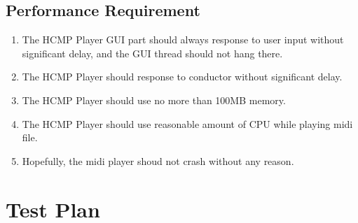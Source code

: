 \subsection{Performance Requirement}
\begin{enumerate}
  \item The HCMP Player GUI part should always response to user input without 
        significant delay, and the GUI thread should not hang there.
  \item The HCMP Player should response to conductor without significant delay.
  \item The HCMP Player should use no more than 100MB memory.
  \item The HCMP Player should use reasonable amount of CPU while playing midi file.
  \item Hopefully, the midi player shoud not crash without any reason. 
\end{enumerate}

\section{Test Plan}
